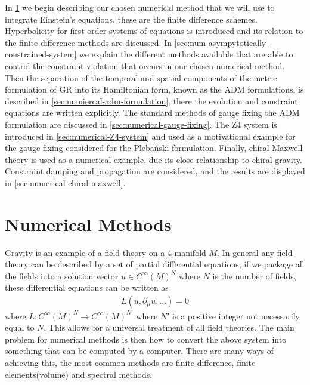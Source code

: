 \documentclass[10pt]{report}
\newcommand{\pleb}[0]{Pleba\'nski}
\theoremstyle{definition}
\begin{document}
In \cref{sec:numerical-method} we begin describing our chosen numerical method that we will use to integrate Einstein's equations, these are the finite difference schemes. Hyperbolicity for first-order systems of equations is introduced and its relation to the finite difference methods are discussed. In \cref{sec:num-asympytotically-constrained-system} we explain the different methods available that are able to control the constraint violation that occurs in our chosen numerical method. Then the separation of the temporal and spatial components of the metric formulation of GR into its Hamiltonian form, known as the ADM formulations, is described in \cref{sec:numiercal-adm-formulation}, there the evolution and constraint equations are written explicitly. The standard methods of gauge fixing the ADM formulation are discussed in \cref{sec:numerical-gauge-fixing}. The Z4 system is introduced in \cref{sec:numerical-Z4-system} and used as a motivational example for the gauge fixing considered for the \pleb{} formulation. Finally, chiral Maxwell theory is used as a numerical example, due its close relationship to chiral gravity. Constraint damping and propagation are considered, and the results are displayed in \cref{sec:numerical-chiral-maxwell}.

\section{Numerical Methods} \label{sec:numerical-method}
Gravity is an example of a field theory on a 4-manifold $M$. In general any field theory can be described by a set of partial differential equations, if we package all the fields into a solution vector $u \in C^\infty(M)^N$ where $N$ is the number of fields, these differential equations can be written as
\begin{align}
    L(u,\partial_\mu u,...) = 0
\end{align}
where $L : C^\infty(M)^N \rightarrow C^\infty(M)^{N'}$ where $N'$ is a positive integer not necessarily equal to $N$. This allows for a universal treatment of all field theories. The main problem for numerical methods is then how to convert the above system into something that can be computed by a computer. There are many ways of achieving this, the most common methods are finite difference, finite elements(volume) and spectral methods.
\end{document}
